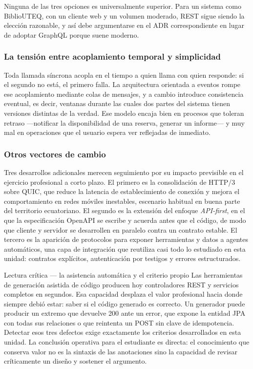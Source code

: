 \documentclass[11pt,a4paper,openany]{book}
\begin{document}
Ninguna de las tres opciones es universalmente superior. Para un sistema como BiblioUTEQ, con un cliente web y un volumen moderado, REST sigue siendo la elección razonable, y así debe argumentarse en el ADR correspondiente en lugar de adoptar GraphQL porque suene moderno.

\subsubsection{La tensión entre acoplamiento temporal y simplicidad}

Toda llamada síncrona acopla en el tiempo a quien llama con quien responde: si el segundo no está, el primero falla. La arquitectura orientada a eventos rompe ese acoplamiento mediante colas de mensajes, y a cambio introduce consistencia eventual, es decir, ventanas durante las cuales dos partes del sistema tienen versiones distintas de la verdad. Ese modelo encaja bien en procesos que toleran retraso ---notificar la disponibilidad de una reserva, generar un informe--- y muy mal en operaciones que el usuario espera ver reflejadas de inmediato.

\subsubsection{Otros vectores de cambio}

Tres desarrollos adicionales merecen seguimiento por su impacto previsible en el ejercicio profesional a corto plazo. El primero es la consolidación de HTTP/3 sobre QUIC, que reduce la latencia de establecimiento de conexión y mejora el comportamiento en redes móviles inestables, escenario habitual en buena parte del territorio ecuatoriano. El segundo es la extensión del enfoque \emph{API-first}, en el que la especificación OpenAPI se escribe y acuerda antes que el código, de modo que cliente y servidor se desarrollen en paralelo contra un contrato estable. El tercero es la aparición de protocolos para exponer herramientas y datos a agentes automáticos, una capa de integración que reutiliza casi todo lo estudiado en esta unidad: contratos explícitos, autenticación por testigos y errores estructurados.

\begin{cajacritica}{Lectura crítica --- la asistencia automática y el criterio propio}
	Las herramientas de generación asistida de código producen hoy controladores REST y servicios completos en segundos. Esa capacidad desplaza el valor profesional hacia donde siempre debió estar: saber si el código generado es correcto. Un generador puede producir un extremo que devuelve 200 ante un error, que expone la entidad JPA con todas sus relaciones o que reintenta un POST sin clave de idempotencia. Detectar esos tres defectos exige exactamente los criterios desarrollados en esta unidad. La conclusión operativa para el estudiante es directa: el conocimiento que conserva valor no es la sintaxis de las anotaciones sino la capacidad de revisar críticamente un diseño y sostener el argumento.
\end{cajacritica}
\end{document}
